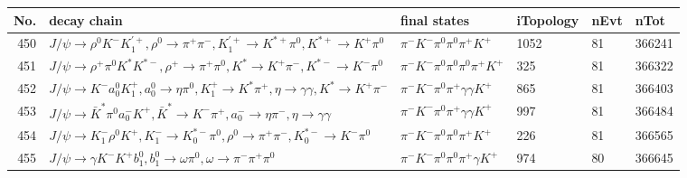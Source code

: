 \begin{table}[htbp] 
\begin{center}
\begin{small}
\begin{tabular}{rlllll}\hline\hline
 No. & decay chain & final states &  iTopology & nEvt & nTot \\\hline
450&$J/\psi       \rightarrow \rho^{0}      K^{-}          K_1^{'+}      , \rho^{0}       \rightarrow \pi^{+}        \pi^{-}        , K_1^{'+}       \rightarrow K^{*+}         \pi^{0}        , K^{*+}          \rightarrow K^{+}          \pi^{0}        $&$\pi^{-}        K^{-}          \pi^{0}        \pi^{0}        \pi^{+}        K^{+}          $& 1052&   81&366241\\
451&$J/\psi       \rightarrow \rho^{+}      \pi^{0}        K^{*}          K^{*-}         , \rho^{+}       \rightarrow \pi^{+}        \pi^{0}        , K^{*}           \rightarrow K^{+}          \pi^{-}        , K^{*-}          \rightarrow K^{-}          \pi^{0}        $&$\pi^{-}        K^{-}          \pi^{0}        \pi^{0}        \pi^{0}        \pi^{+}        K^{+}          $&  325&   81&366322\\
452&$J/\psi       \rightarrow K^{-}          a_{0}^{0}      K_1^{+}        , a_{0}^{0}       \rightarrow \eta          \pi^{0}        , K_1^{+}         \rightarrow K^{*}          \pi^{+}        , \eta           \rightarrow \gamma       \gamma       , K^{*}           \rightarrow K^{+}          \pi^{-}        $&$\pi^{-}        K^{-}          \pi^{0}        \pi^{+}        \gamma       \gamma       K^{+}          $&  865&   81&366403\\
453&$J/\psi       \rightarrow \bar{K}^{*}   \pi^{0}        a_{0}^{-}      K^{+}          , \bar{K}^{*}    \rightarrow K^{-}          \pi^{+}        , a_{0}^{-}       \rightarrow \eta          \pi^{-}        , \eta           \rightarrow \gamma       \gamma       $&$\pi^{-}        K^{-}          \pi^{0}        \pi^{+}        \gamma       \gamma       K^{+}          $&  997&   81&366484\\
454&$J/\psi       \rightarrow K_{1}^{-}      \rho^{0}      K^{+}          , K_{1}^{-}       \rightarrow K_{0}^{*-}     \pi^{0}        , \rho^{0}       \rightarrow \pi^{+}        \pi^{-}        , K_{0}^{*-}      \rightarrow K^{-}          \pi^{0}        $&$\pi^{-}        K^{-}          \pi^{0}        \pi^{0}        \pi^{+}        K^{+}          $&  226&   81&366565\\
455&$J/\psi       \rightarrow \gamma       K^{-}          K^{+}          b_{1}^{0}      , b_{1}^{0}       \rightarrow \omega         \pi^{0}        , \omega          \rightarrow \pi^{-}        \pi^{+}        \pi^{0}        $&$\pi^{-}        K^{-}          \pi^{0}        \pi^{0}        \pi^{+}        \gamma       K^{+}          $&  974&   80&366645\\

\end{tabular}
\end{small}
\end{center}
\end{table}
